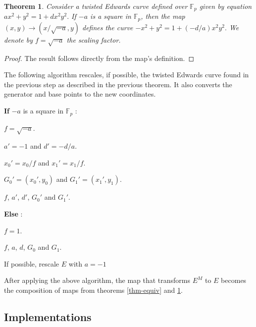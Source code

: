 \documentclass{article}
\newcommand{\Fp}{\ensuremath{\mathbb{F}_p}}
\newtheorem{thm}{Theorem}[section]
\theoremstyle{definition}
\theoremstyle{remark}
\begin{document}
\begin{spacing}{1.2}
\begin{multicols}{2}
\begin{thm} \label{thm-scale} %
Consider a twisted Edwards curve defined over $\Fp$ given by equation $ax^2+y^2= 1 +dx^2y^2.$ If $-a$ is a square in $\Fp$, then the map $(x, y) \to (x/\sqrt{-a}, y)$ defines the curve $-x^2+y^2= 1 +(-d/a)x^2y^2.$ We denote by $f = \sqrt{-a}$ the scaling factor.
\end{thm}

\begin{proof}
The result follows directly from the map's definition.
\end{proof}

The following algorithm rescales, if possible, the twisted Edwards curve found in the previous step as described in the previous theorem. It also converts the generator and base points to the new coordinates.

\vspace{0.2cm}
\begin{algorithm}[H] %
	\SetAlgoLined
	
	
	{\bf If} $-a$ is a square in $\Fp$ : 
	
		 $f = \sqrt{-a}$.
	
		 $ a' = -1 $ and $d' = -d/a$.
	
		 $ x_0' = x_0/f $ and $ x_1' = x_1/f $.	
	
		 $ G_0' = (x_0', y_0) $ and $G_1' = (x_1', y_1)$.
	
	
		 $f$, $a'$, $d'$, $G_0'$ and $G_1'$.
	
	{\bf Else} :
	
		 $f = 1$.
	
		 $f$, $a$, $d$, $G_0$ and $G_1$.

\caption{If possible, rescale $E$ with $a= -1$}
\end{algorithm}
\vspace{0.2cm}

After applying the above algorithm, the map that transforms $E^M$ to $E$ becomes the composition of maps from theorems \ref{thm-equiv} and \ref{thm-scale}. 


\subsection{Implementations}


\end{multicols}
\end{spacing}
\end{document}
